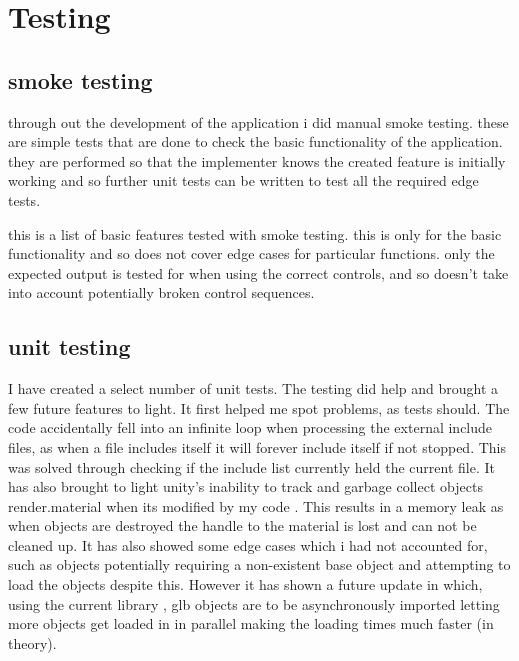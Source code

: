 
\section{Testing}
\subsection{smoke testing}
through out the development of the application i did manual smoke testing. these are simple tests that are done to check the basic functionality of the application. they are performed so that the implementer knows the created feature is initially working and so further unit tests can be written to test all the required edge tests.

this is a list of basic features tested with smoke testing. this is only for the basic functionality and so does not cover edge cases for particular functions. only the expected output is tested for when using the correct controls, and so doesn't take into account potentially broken control sequences.


\subsection{unit testing}
I have created a select number of unit tests. The testing did help and brought a few future features to light. It first helped me spot problems, as tests should. The code accidentally fell into an infinite loop when processing the external include files, as when a file includes itself it will forever include itself if not stopped. This was solved through checking if the include list currently held the current file. It has also brought to light unity's inability to track and garbage collect objects render.material when its modified by my code \cite{Unity_Mat_Technologies}. This results in a memory leak as when objects are destroyed the handle to the material is lost and can not be cleaned up. It has also showed some edge cases which i had not accounted for, such as objects potentially requiring a non-existent base object and attempting to load the objects despite this. However it has shown a future update in which, using the current library \cite{siccity_2021_github}, glb objects are to be asynchronously imported letting more objects get loaded in in parallel making the loading times much faster (in theory).

